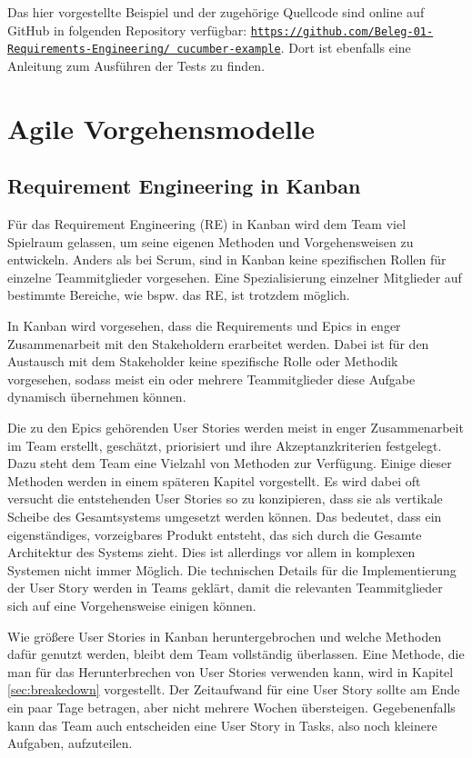 \documentclass[acmtog]{acmart}
\begin{document}
Das hier vorgestellte Beispiel und der zugehörige Quellcode sind online auf GitHub in folgenden Repository verfügbar:
\href{https://github.com/Beleg-01-Requirements-Engineering/cucumber-example}{\texttt{https://github.com/Beleg-01-Requirements-Engineering/
		cucumber-example}}.
Dort ist ebenfalls eine Anleitung zum Ausführen der Tests zu finden.


\section{Agile Vorgehensmodelle}

\subsection{Requirement Engineering in Kanban}

Für das Requirement Engineering (RE) in Kanban wird dem Team viel Spielraum gelassen, 
um seine eigenen Methoden und Vorgehensweisen zu entwickeln. Anders als bei Scrum, sind 
in Kanban keine spezifischen Rollen für einzelne Teammitglieder vorgesehen. Eine 
Spezialisierung einzelner Mitglieder auf bestimmte Bereiche, wie bspw. das RE, ist trotzdem 
möglich.

In Kanban wird vorgesehen, dass die Requirements und Epics in enger Zusammenarbeit mit 
den Stakeholdern erarbeitet werden. Dabei ist für den Austausch mit dem Stakeholder keine 
spezifische Rolle oder Methodik vorgesehen, sodass meist ein oder mehrere Teammitglieder 
diese Aufgabe dynamisch übernehmen können. \cite{agileprocesses}

Die zu den Epics gehörenden User Stories werden meist in enger Zusammenarbeit im Team erstellt, 
geschätzt, priorisiert und ihre Akzeptanzkriterien festgelegt. Dazu steht dem Team eine Vielzahl 
von Methoden zur Verfügung. Einige dieser Methoden werden in einem späteren Kapitel vorgestellt. 
Es wird dabei oft versucht die entstehenden User Stories so zu konzipieren, dass sie als vertikale 
Scheibe des Gesamtsystems umgesetzt werden können. Das bedeutet, dass ein eigenständiges, vorzeigbares 
Produkt entsteht, das sich durch die Gesamte Architektur des Systems zieht. Dies ist allerdings 
vor allem in komplexen Systemen nicht immer Möglich. Die technischen Details für die Implementierung 
der User Story werden in Teams geklärt, damit die relevanten Teammitglieder sich auf eine Vorgehensweise 
einigen können. \cite{agileprocesses}

Wie größere User Stories in Kanban heruntergebrochen und welche Methoden dafür genutzt werden, bleibt 
dem Team vollständig überlassen. Eine Methode, die man für das Herunterbrechen von User Stories verwenden 
kann, wird in Kapitel \ref{sec:breakedown} vorgestellt. Der Zeitaufwand für eine User Story sollte am Ende ein paar 
Tage betragen, aber nicht mehrere Wochen übersteigen. Gegebenenfalls kann das Team auch entscheiden 
eine User Story in Tasks, also noch kleinere Aufgaben, aufzuteilen. \cite{agileprocesses}
\end{document}

